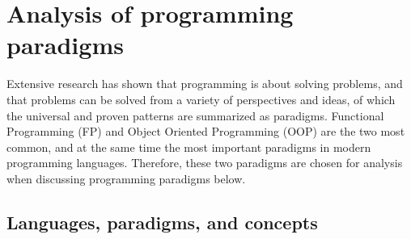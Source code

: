 \section{Analysis of programming paradigms}


Extensive research has shown that programming is about solving problems,
and that problems can be solved from a variety of perspectives
and ideas, of which the universal and proven patterns are
summarized as paradigms.
Functional Programming (FP) and Object Oriented Programming (OOP)
are the two most common, and at the same time the most important paradigms
in modern programming languages.
Therefore, these two paradigms are chosen for analysis when discussing
programming paradigms below.

\subsection{Languages, paradigms, and concepts}



